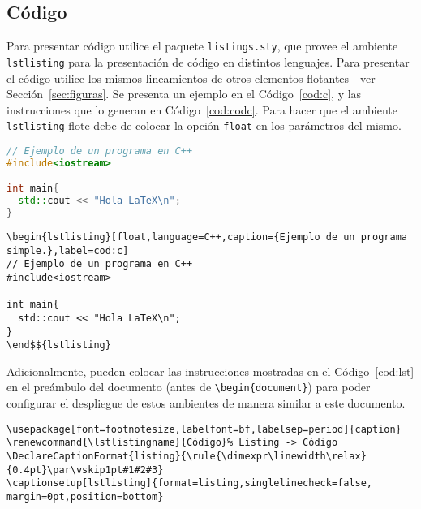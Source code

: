 \documentclass[twocolumn,11pts]{IEEEtran}
\renewcommand{\lstlistingname}{Código}%
\begin{document}
\subsection{Código}

Para presentar código utilice el paquete \texttt{listings.sty}, que provee el ambiente \texttt{lstlisting} para la presentación de código en distintos lenguajes. Para presentar el código utilice los mismos lineamientos de otros elementos flotantes---ver Sección~\ref{sec:figuras}. Se presenta un ejemplo en el Código~\ref{cod:c}, y las instrucciones que lo generan en Código~\ref{cod:codc}. Para hacer que el ambiente \texttt{lstlisting} flote debe de colocar la opción \texttt{float} en los parámetros del mismo.

\begin{lstlisting}[float,language=C++,caption={Ejemplo de un programa simple.},label=cod:c]
// Ejemplo de un programa en C++
#include<iostream>

int main{
  std::cout << "Hola LaTeX\n";
}
\end{lstlisting}

\begin{lstlisting}[float=tb,caption={Código que produce el Código~\ref{cod:c}.},label=cod:codc,mathescape=true]
\begin{lstlisting}[float,language=C++,caption={Ejemplo de un programa simple.},label=cod:c]
// Ejemplo de un programa en C++
#include<iostream>

int main{
  std::cout << "Hola LaTeX\n";
}
\end$${lstlisting}
\end{lstlisting}

Adicionalmente, pueden colocar las instrucciones mostradas en el Código~\ref{cod:lst} en el preámbulo del documento (antes de \verb|\begin{document}|) para poder configurar el despliegue de estos ambientes de manera similar a este documento.

\begin{lstlisting}[float=tb,caption={Instrucciones que configuran el paquete \texttt{listings.sty}.},label=cod:lst]
\usepackage[font=footnotesize,labelfont=bf,labelsep=period]{caption}
\renewcommand{\lstlistingname}{Código}% Listing -> Código
\DeclareCaptionFormat{listing}{\rule{\dimexpr\linewidth\relax}{0.4pt}\par\vskip1pt#1#2#3}
\captionsetup[lstlisting]{format=listing,singlelinecheck=false, margin=0pt,position=bottom}
\end{lstlisting}
\end{document}
